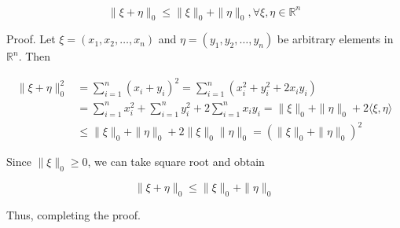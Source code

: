 \documentclass{article}
\begin{document}
$$
\|\xi+\eta\|_{0} \leq\|\xi\|_{0}+\|\eta\|_{0}, \forall \xi, \eta \in \mathbb{R}^{n}
$$

Proof. Let $\xi=\left(x_{1}, x_{2}, \ldots, x_{n}\right)$ and $\eta=\left(y_{1}, y_{2}, \ldots, y_{n}\right)$ be arbitrary elements in $\mathbb{R}^{n}$. Then

$$
\begin{aligned}
\|\xi+\eta\|_{0}^{2} & =\sum_{i=1}^{n}\left(x_{i}+y_{i}\right)^{2}=\sum_{i=1}^{n}\left(x_{i}^{2}+y_{i}^{2}+2 x_{i} y_{i}\right) \\
& =\sum_{i=1}^{n} x_{i}^{2}+\sum_{i=1}^{n} y_{i}^{2}+2 \sum_{i=1}^{n} x_{i} y_{i}=\|\xi\|_{0}+\|\eta\|_{0}+2\langle\xi, \eta\rangle \\
& \leq\|\xi\|_{0}+\|\eta\|_{0}+2\|\xi\|_{0}\|\eta\|_{0}=\left(\|\xi\|_{0}+\|\eta\|_{0}\right)^{2}
\end{aligned}
$$

Since $\|\xi\|_{0} \geq 0$, we can take square root and obtain

$$
\|\xi+\eta\|_{0} \leq\|\xi\|_{0}+\|\eta\|_{0}
$$

Thus, completing the proof.
\end{document}
